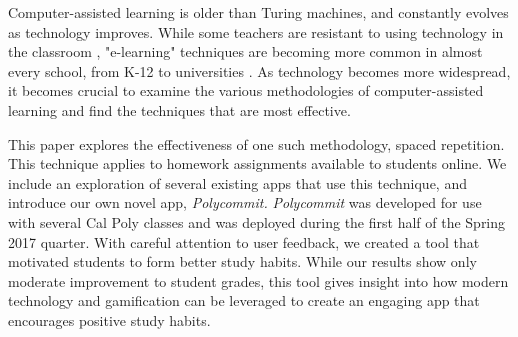 \par Computer-assisted learning is older than Turing machines, and constantly evolves as technology improves. While some teachers are resistant to using technology in the classroom \cite{BJET:BJET12051}, "e-learning" techniques are becoming more common in almost every school, from K-12 to universities \cite{EJED:EJED12020}. As technology becomes more widespread, it becomes crucial to examine the various methodologies of computer-assisted learning and find the techniques that are most effective.

\par This paper explores the effectiveness of one such methodology, spaced repetition. This technique applies to homework assignments available to students online. We include an exploration of several existing apps that use this technique, and introduce our own novel app, \textit{Polycommit.} \textit{Polycommit} was developed for use with several Cal Poly classes and was deployed during the first half of the Spring 2017 quarter. With careful attention to user feedback, we created a tool that motivated students to form better study habits. While our results show only moderate improvement to student grades, this tool gives insight into how modern technology and gamification can be leveraged to create an engaging app that encourages positive study habits.